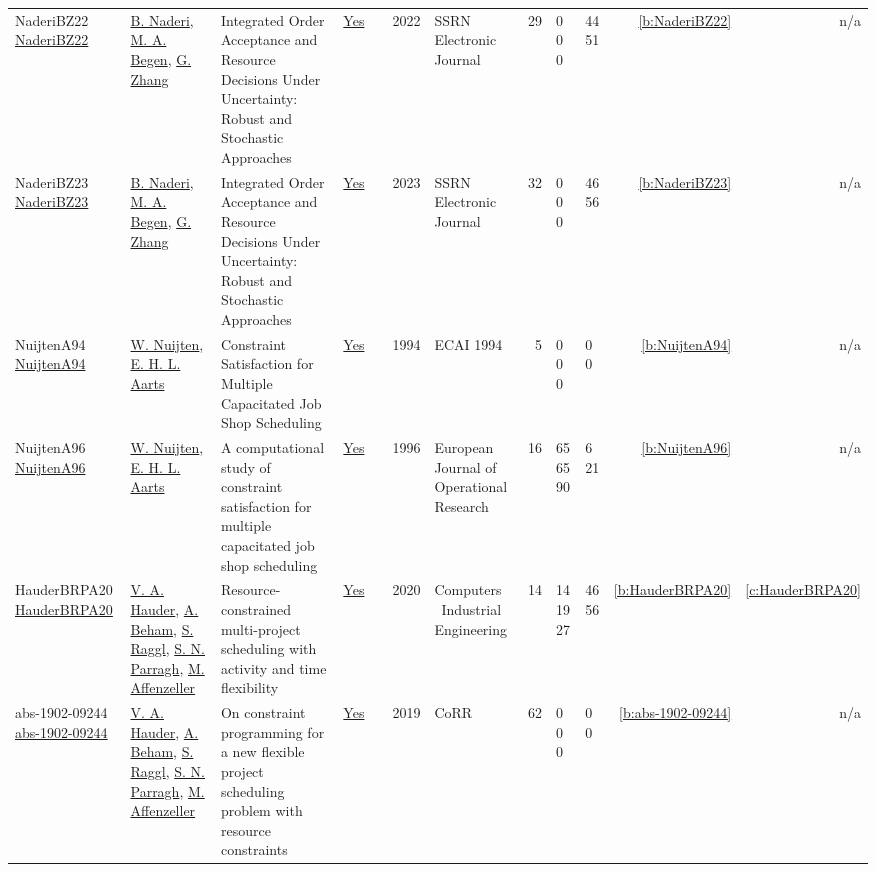 {\begin{longtable}{>{\raggedright\arraybackslash}p{3cm}>{\raggedright\arraybackslash}p{4.5cm}>{\raggedright\arraybackslash}p{6.0cm}rrrp{2.5cm}rp{1cm}p{1cm}rr}
NaderiBZ22 \href{http://dx.doi.org/10.2139/ssrn.4140716}{NaderiBZ22} & \hyperref[auth:a726]{B. Naderi}, \hyperref[auth:a836]{M. A. Begen}, \hyperref[auth:a837]{G. Zhang} & Integrated Order Acceptance and Resource Decisions Under Uncertainty: Robust and Stochastic Approaches & \href{../works/NaderiBZ22.pdf}{Yes} & \cite{NaderiBZ22} & 2022 & SSRN Electronic Journal & 29 & 0 0 0 & 44 51 & \ref{b:NaderiBZ22} & n/a\\
NaderiBZ23 \href{http://dx.doi.org/10.2139/ssrn.4494381}{NaderiBZ23} & \hyperref[auth:a726]{B. Naderi}, \hyperref[auth:a836]{M. A. Begen}, \hyperref[auth:a837]{G. Zhang} & Integrated Order Acceptance and Resource Decisions Under Uncertainty: Robust and Stochastic Approaches & \href{../works/NaderiBZ23.pdf}{Yes} & \cite{NaderiBZ23} & 2023 & SSRN Electronic Journal & 32 & 0 0 0 & 46 56 & \ref{b:NaderiBZ23} & n/a\\
NuijtenA94 \href{}{NuijtenA94} & \hyperref[auth:a656]{W. Nuijten}, \hyperref[auth:a777]{E. H. L. Aarts} & Constraint Satisfaction for Multiple Capacitated Job Shop Scheduling & \href{../works/NuijtenA94.pdf}{Yes} & \cite{NuijtenA94} & 1994 & ECAI 1994 & 5 & 0 0 0 & 0 0 & \ref{b:NuijtenA94} & n/a\\
NuijtenA96 \href{http://dx.doi.org/10.1016/0377-2217(95)00354-1}{NuijtenA96} & \hyperref[auth:a656]{W. Nuijten}, \hyperref[auth:a777]{E. H. L. Aarts} & A computational study of constraint satisfaction for multiple capacitated job shop scheduling & \href{../works/NuijtenA96.pdf}{Yes} & \cite{NuijtenA96} & 1996 & European Journal of Operational Research & 16 & 65 65 90 & 6 21 & \ref{b:NuijtenA96} & n/a\\
HauderBRPA20 \href{http://dx.doi.org/10.1016/j.cie.2020.106857}{HauderBRPA20} & \hyperref[auth:a550]{V. A. Hauder}, \hyperref[auth:a551]{A. Beham}, \hyperref[auth:a552]{S. Raggl}, \hyperref[auth:a553]{S. N. Parragh}, \hyperref[auth:a554]{M. Affenzeller} & \cellcolor{green!10}Resource-constrained multi-project scheduling with activity and time flexibility & \href{../works/HauderBRPA20.pdf}{Yes} & \cite{HauderBRPA20} & 2020 & Computers \  Industrial Engineering & 14 & 14 19 27 & 46 56 & \ref{b:HauderBRPA20} & \ref{c:HauderBRPA20}\\
abs-1902-09244 \href{http://arxiv.org/abs/1902.09244}{abs-1902-09244} & \hyperref[auth:a550]{V. A. Hauder}, \hyperref[auth:a551]{A. Beham}, \hyperref[auth:a552]{S. Raggl}, \hyperref[auth:a553]{S. N. Parragh}, \hyperref[auth:a554]{M. Affenzeller} & On constraint programming for a new flexible project scheduling problem with resource constraints & \href{../works/abs-1902-09244.pdf}{Yes} & \cite{abs-1902-09244} & 2019 & CoRR & 62 & 0 0 0 & 0 0 & \ref{b:abs-1902-09244} & n/a\\

\end{longtable}}
